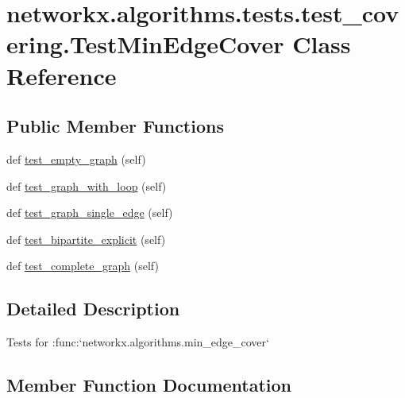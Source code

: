 \hypertarget{classnetworkx_1_1algorithms_1_1tests_1_1test__covering_1_1TestMinEdgeCover}{}\section{networkx.\+algorithms.\+tests.\+test\+\_\+covering.\+Test\+Min\+Edge\+Cover Class Reference}
\label{classnetworkx_1_1algorithms_1_1tests_1_1test__covering_1_1TestMinEdgeCover}
\subsection*{Public Member Functions}
\begin{DoxyCompactItemize}
\item 
def \hyperlink{classnetworkx_1_1algorithms_1_1tests_1_1test__covering_1_1TestMinEdgeCover_a2e450697ed8ff8964a5725d96dacfa52}{test\+\_\+empty\+\_\+graph} (self)
\item 
def \hyperlink{classnetworkx_1_1algorithms_1_1tests_1_1test__covering_1_1TestMinEdgeCover_abcd014ca48f96ddab76dd367dc38db3c}{test\+\_\+graph\+\_\+with\+\_\+loop} (self)
\item 
def \hyperlink{classnetworkx_1_1algorithms_1_1tests_1_1test__covering_1_1TestMinEdgeCover_a20143fd06ab8cc654c0cc40595891a0d}{test\+\_\+graph\+\_\+single\+\_\+edge} (self)
\item 
def \hyperlink{classnetworkx_1_1algorithms_1_1tests_1_1test__covering_1_1TestMinEdgeCover_a2071fb97c7624c02e8278f3411cc1b59}{test\+\_\+bipartite\+\_\+explicit} (self)
\item 
def \hyperlink{classnetworkx_1_1algorithms_1_1tests_1_1test__covering_1_1TestMinEdgeCover_a10acd0c60d3c250ef7bc9a4109666d90}{test\+\_\+complete\+\_\+graph} (self)
\end{DoxyCompactItemize}


\subsection{Detailed Description}
\begin{DoxyVerb}Tests for :func:`networkx.algorithms.min_edge_cover`\end{DoxyVerb}
 

\subsection{Member Function Documentation}
\mbox{\label{classnetworkx_1_1algorithms_1_1tests_1_1test__covering_1_1TestMinEdgeCover_a2071fb97c7624c02e8278f3411cc1b59}} 
